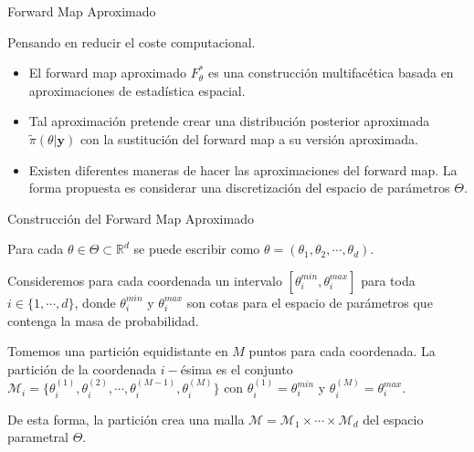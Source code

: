 \documentclass[10pt,aspectratio=169]{beamer}
\begin{document}

\begin{frame}{Forward Map Aproximado}
  
  Pensando en reducir el coste computacional.

  \begin{itemize}
    \item 
    El forward map aproximado $F_{\theta}^{*}$ es una construcción multifacética basada en aproximaciones de estadística espacial. 
    \vspace{0.5 cm}
    \item
    Tal aproximación pretende crear una distribución posterior aproximada $\tilde{\pi}(\theta|\mathbf{y})$ con la sustitución del forward map a su versión aproximada.
    \item 
    \vspace{0.5 cm}
    Existen diferentes maneras de hacer las aproximaciones del forward map. La forma propuesta es considerar una discretización del espacio de parámetros $\Theta$.
  \end{itemize}
  



\end{frame}

\begin{frame}{Construcción del Forward Map Aproximado}

  Para cada $\theta \in \Theta \subset \mathbb{R}^d$ se puede escribir como $\theta = (\theta_1, \theta_2, \cdots, \theta_d)$.

  Consideremos para cada coordenada un intervalo $[\theta_i^{min},\theta_i^{max}]$ para toda $i \in \{1,\cdots,d\}$, donde $\theta_i^{min}$ y $\theta_i^{max}$ son cotas para el espacio de parámetros que contenga la masa de probabilidad.
  
  Tomemos una partición equidistante en $M$ puntos para cada coordenada. La partición de la coordenada $i-$ésima es el conjunto $\mathcal{M}_i =\{ \theta_i^{(1)}, \theta_i^{(2)},\cdots , \theta_i^{(M-1)}, \theta_i^{(M)}\}$ con $\theta_i^{(1)} = \theta_i^{min}$ y $\theta_i^{(M)} = \theta_i^{max}$.

  De esta forma, la partición crea una malla $\mathcal{M} = \mathcal{M}_1 \times \cdots \times \mathcal{M}_d$ del espacio parametral $\Theta$.

\end{frame}
\end{document}
